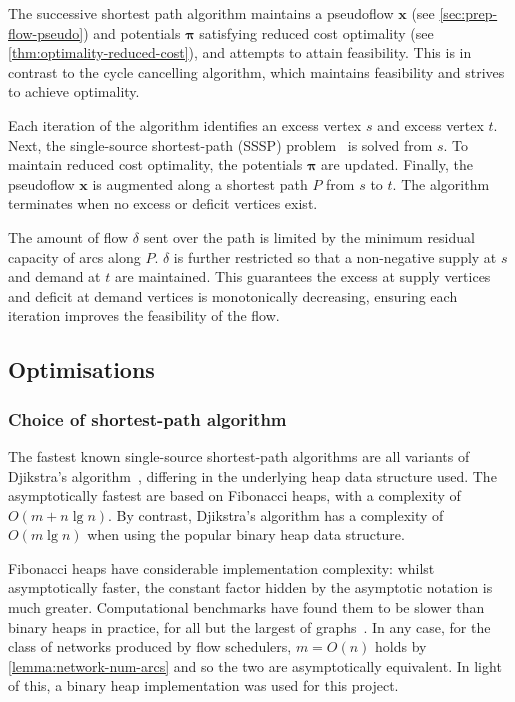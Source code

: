 
The successive shortest path algorithm maintains a pseudoflow $\mathbf{x}$ (see \cref{sec:prep-flow-pseudo}) and potentials $\boldsymbol{\pi}$ satisfying reduced cost optimality (see \cref{thm:optimality-reduced-cost}), and attempts to attain feasibility. This is in contrast to the cycle cancelling algorithm, which maintains feasibility and strives to achieve optimality.

Each iteration of the algorithm identifies an excess vertex $s$ and excess vertex $t$. Next, the single-source shortest-path (SSSP) problem~\cite[ch.~24]{CLRS:2009} is solved from $s$. To maintain reduced cost optimality, the potentials $\boldsymbol{\pi}$ are updated. Finally, the pseudoflow $\mathbf{x}$ is augmented along a shortest path $P$ from $s$ to $t$. The algorithm terminates when no excess or deficit vertices exist.

The amount of flow $\delta$ sent over the path is limited by the minimum residual capacity of arcs along $P$. $\delta$ is further restricted so that a non-negative supply at $s$ and demand at $t$ are maintained. This guarantees the excess at supply vertices and deficit at demand vertices is monotonically decreasing, ensuring each iteration improves the feasibility of the flow.

\subsection{Optimisations} \label{sec:impl-ssp-optimisations}

\subsubsection{Choice of shortest-path algorithm}
The fastest known single-source shortest-path algorithms are all variants of Djikstra's algorithm~\cite[ch.~4]{Ahuja:1993}, differing in the underlying heap data structure used. The asymptotically fastest are based on Fibonacci heaps, with a complexity of $O(m + n\lg n)$. By contrast, Djikstra's algorithm has a complexity of $O(m\lg n)$ when using the popular binary heap data structure.

Fibonacci heaps have considerable implementation complexity: whilst asymptotically faster, the constant factor hidden by the asymptotic notation is much greater. Computational benchmarks have found them to be slower than binary heaps in practice, for all but the largest of graphs~\cite[p.~15]{KiralyKovacs:2012}. In any case, for the class of networks produced by flow schedulers, $m = O(n)$ holds by \cref{lemma:network-num-arcs} and so the two are asymptotically equivalent. In light of this, a binary heap implementation was used for this project.

